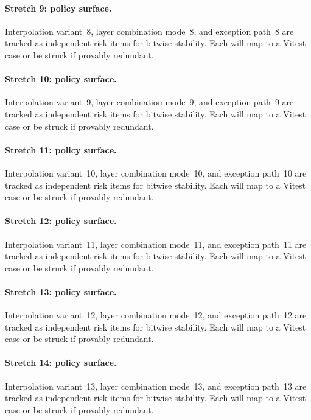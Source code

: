 \documentclass[sigconf,nonacm]{acmart}
\begin{document}
\paragraph{Stretch 9: policy surface.}
Interpolation variant~8, layer combination mode~8, and exception path~8 are tracked as independent risk items for bitwise stability. Each will map to a Vitest case or be struck if provably redundant. %

\paragraph{Stretch 10: policy surface.}
Interpolation variant~9, layer combination mode~9, and exception path~9 are tracked as independent risk items for bitwise stability. Each will map to a Vitest case or be struck if provably redundant. %

\paragraph{Stretch 11: policy surface.}
Interpolation variant~10, layer combination mode~10, and exception path~10 are tracked as independent risk items for bitwise stability. Each will map to a Vitest case or be struck if provably redundant. %

\paragraph{Stretch 12: policy surface.}
Interpolation variant~11, layer combination mode~11, and exception path~11 are tracked as independent risk items for bitwise stability. Each will map to a Vitest case or be struck if provably redundant. %

\paragraph{Stretch 13: policy surface.}
Interpolation variant~12, layer combination mode~12, and exception path~12 are tracked as independent risk items for bitwise stability. Each will map to a Vitest case or be struck if provably redundant. %

\paragraph{Stretch 14: policy surface.}
Interpolation variant~13, layer combination mode~13, and exception path~13 are tracked as independent risk items for bitwise stability. Each will map to a Vitest case or be struck if provably redundant. %
\end{document}
